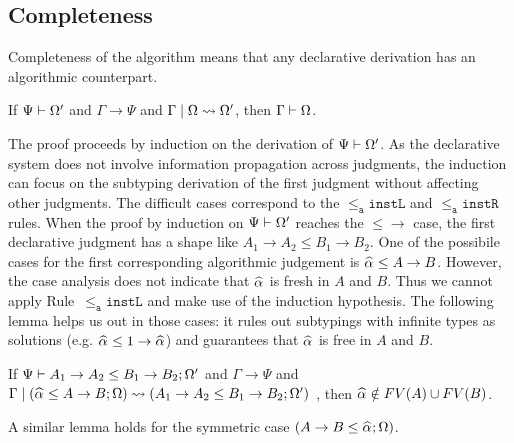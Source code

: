 
\subsection{Completeness}

Completeness of the algorithm means that any declarative derivation has an
algorithmic counterpart. 
\begin{theorem}[Completeness]
	If $\Psi\vdash \Omega'$ and $\Gamma \to \Psi$ and $\Gamma \mid \Omega\rightsquigarrow \Omega'$, then $\Gamma\vdash \Omega$.
\end{theorem}

The proof proceeds by induction on the derivation of $\Psi\vdash\Omega'$. As the
declarative system does not involve information propagation across judgments,
the induction can focus on the subtyping derivation of the first judgment
without affecting other judgments.
The difficult cases correspond to the $\mathtt{{\le_a}instL}$ and
$\mathtt{{\le_a}instR}$ rules.  When the proof by induction on $\Psi\vdash
\Omega'$ reaches the $\mathtt{{\le}{\to}}$ case, the first declarative
judgment has a shape like $A_1\to A_2 \le B_1\to B_2$. 
One of the possibile cases for the first corresponding algorithmic judgement
is $\al\le A\to B$. However, the case analysis does not indicate
that $\al$ is fresh in $A$ and $B$. Thus we cannot apply
Rule~$\mathtt{{\le_a}instL}$ and make use of the induction hypothesis.
The following lemma helps us out in those cases:
it rules out subtypings with infinite types as solutions (e.g. $\al \le 1
\to \al$) and guarantees that $\al$ is free in $A$ and $B$.
\begin{lemma}
	If $\Psi \vdash A_1\to A_2 \le B_1\to B_2 ; \Omega'$ and $\Gamma\to \Psi$ and $\Gamma\mid (\jcons{\al \le A\to B}{\exps}) \rightsquigarrow
	(\jcons{A_1\to A_2 \le B_1\to B_2}{\exps'})$
	, then $\al \notin FV(A)\cup FV(B)$. 
\end{lemma}
A similar lemma holds for the symmetric case $(\jcons{A \to B \le \al}{\Omega})$.

